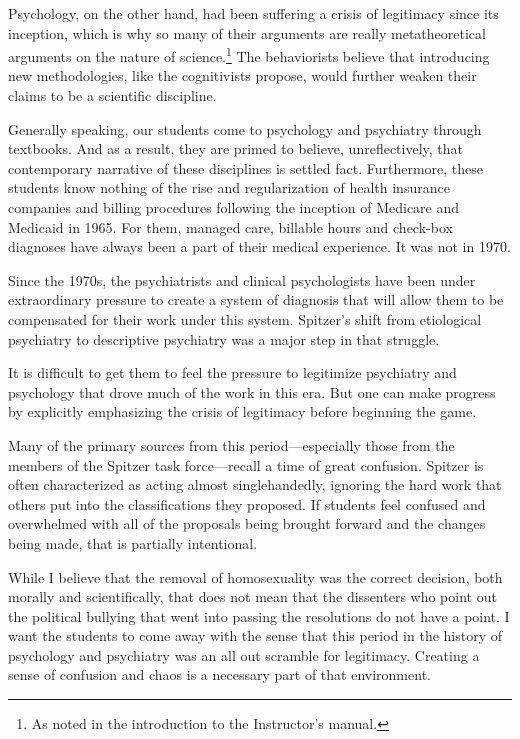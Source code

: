 \begin{refsection}
Psychology, on the other hand, had been suffering a crisis of legitimacy since its inception, which is why so many of their arguments are really metatheoretical arguments on the nature of science.\footnote{As noted in the introduction to the Instructor's manual.} The behaviorists believe that introducing new methodologies, like the cognitivists propose, would further weaken their claims to be a scientific discipline. 

Generally speaking, our students come to psychology and psychiatry through textbooks. And as a result, they are primed to believe, unreflectively, that contemporary narrative of these disciplines is settled fact. Furthermore, these students know nothing of the rise and regularization of health insurance companies and billing procedures following the inception of Medicare and Medicaid in 1965. For them, managed care, billable hours and check-box diagnoses have always been a part of their medical experience. It was not in 1970. 

Since the 1970s, the psychiatrists and clinical psychologists have been under extraordinary pressure to create a system of diagnosis that will allow them to be compensated for their work under this system. Spitzer's shift from etiological psychiatry to descriptive psychiatry was a major step in that struggle. 

It is difficult to get them to feel the pressure to legitimize psychiatry and psychology that drove much of the work in this era. But one can make progress by explicitly emphasizing the crisis of legitimacy before beginning the game.

Many of the primary sources from this period---especially those from the members of the Spitzer task force---recall a time of great confusion. Spitzer is often characterized as acting almost singlehandedly, ignoring the hard work that others put into the classifications they proposed. If students feel confused and overwhelmed with all of the proposals being brought forward and the changes being made, that is partially intentional. 

While I believe that the removal of homosexuality was the correct decision, both morally and scientifically, that does not mean that the dissenters who point out the political bullying that went into passing the resolutions do not have a point. I want the students to come away with the sense that this period in the history of psychology and psychiatry was an all out scramble for legitimacy. Creating a sense of confusion and chaos is a necessary part of that environment.


\end{refsection}
